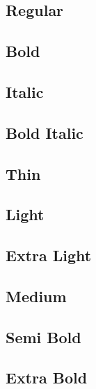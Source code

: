 \documentclass{article}
\begin{document}
\subsection*{Regular}
\lipsum[1]


\subsection*{Bold}

\textbf{\lipsum[2]}


\subsection*{Italic}

\textit{\lipsum[3]}

\subsection*{Bold Italic}

\textbf{\textit{\lipsum[4]}}


\subsection*{Thin}

{\interthin \lipsum[5]}

\subsection*{Light}

{\interlight \lipsum[6]}

\subsection*{Extra Light}

{\interextralight \lipsum[7]}

\subsection*{Medium}
{\intermedium \lipsum[8]}

\subsection*{Semi Bold}
{\intersemibold \lipsum[9]}

\subsection*{Extra Bold}
{\interextrabold\lipsum[10]}
\end{document}
